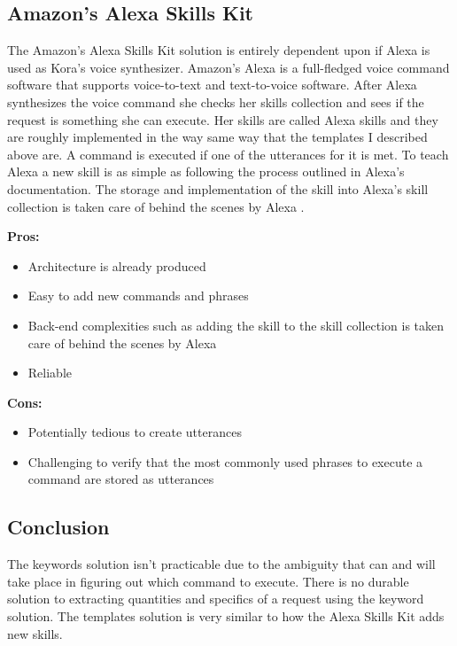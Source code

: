 \documentclass[onecolumn, draftclsnofoot,10pt, compsoc]{IEEEtran}
\begin{document}
				
			\subsection{Amazon's Alexa Skills Kit}
				The Amazon's Alexa Skills Kit solution is entirely dependent upon if Alexa is used as Kora's voice synthesizer.
				Amazon's Alexa is a full-fledged voice command software that supports voice-to-text and text-to-voice software.
				After Alexa synthesizes the voice command she checks her skills collection and sees if the request is something she can execute.
				Her skills are called Alexa skills and they are roughly implemented in the way same way that the templates I described above are.
				A command is executed if one of the utterances for it is met.
				To teach Alexa a new skill is as simple as following the process outlined in Alexa's documentation.
				The storage and implementation of the skill into Alexa's skill collection is taken care of behind the scenes by Alexa \cite{alexaSkills}.
				
				\textbf{Pros:}
					\begin{itemize}
						\item{
						Architecture is already produced}
					\item{
						Easy to add new commands and phrases}
					\item{
						Back-end complexities such as adding the skill to the skill collection is taken care of behind the scenes by Alexa}
					\item{
						Reliable}
					\end{itemize}
				
				\textbf{Cons:}
					\begin{itemize}
						\item{
							Potentially tedious to create utterances}
						\item{
							Challenging to verify that the most commonly used phrases to execute a command are stored as utterances}
					\end{itemize}
	
	
		\subsection{Conclusion}
			The keywords solution isn't practicable due to the ambiguity that can and will take place in figuring out which command to execute.
			There is no durable solution to extracting quantities and specifics of a request using the keyword solution.
			The templates solution is very similar to how the Alexa Skills Kit adds new skills.
			
\end{document}

